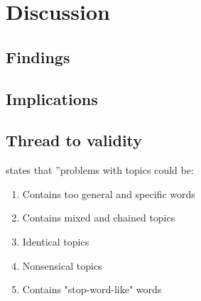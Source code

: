 \chapter{Discussion}
    \section{Findings}

    \section{Implications}
    
    \section{Thread to validity}
        \cite{boyd2014care} states that ''problems with topics could be: 
            \begin{enumerate}
                \item Contains too general and specific words
                \item Contains mixed and chained topics
                \item Identical topics
                \item Nonsensical topics
                \item Contains "stop-word-like" words
            \end{enumerate}
